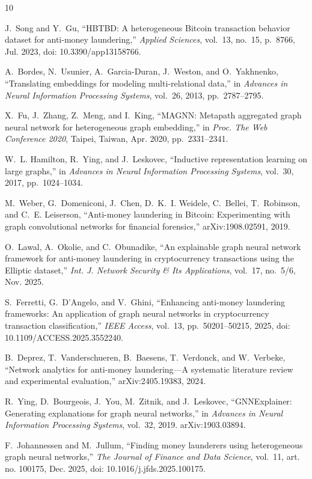 \documentclass[conference]{IEEEtran}
\begin{document}
\begin{thebibliography}{10}

J.~Song and Y.~Gu, ``HBTBD: A heterogeneous Bitcoin transaction behavior
dataset for anti-money laundering,'' \emph{Applied Sciences}, vol.~13,
no.~15, p.~8766, Jul. 2023, doi: 10.3390/app13158766.

A.~Bordes, N.~Usunier, A.~Garcia-Duran, J.~Weston, and O.~Yakhnenko,
``Translating embeddings for modeling multi-relational data,'' in
\emph{Advances in Neural Information Processing Systems}, vol.~26, 2013,
pp.~2787--2795.

X.~Fu, J.~Zhang, Z.~Meng, and I.~King, ``MAGNN: Metapath aggregated graph
neural network for heterogeneous graph embedding,'' in \emph{Proc. The Web
Conference 2020}, Taipei, Taiwan, Apr. 2020, pp.~2331--2341.

W.~L. Hamilton, R.~Ying, and J.~Leskovec, ``Inductive representation learning
on large graphs,'' in \emph{Advances in Neural Information Processing
Systems}, vol.~30, 2017, pp.~1024--1034.

M.~Weber, G.~Domeniconi, J.~Chen, D.~K.~I. Weidele, C.~Bellei, T.~Robinson,
and C.~E. Leiserson, ``Anti-money laundering in Bitcoin: Experimenting with
graph convolutional networks for financial forensics,'' arXiv:1908.02591,
2019.

O.~Lawal, A.~Okolie, and C.~Obunadike, ``An explainable graph neural network
framework for anti-money laundering in cryptocurrency transactions using the
Elliptic dataset,'' \emph{Int. J. Network Security \& Its Applications},
vol.~17, no.~5/6, Nov. 2025.

S.~Ferretti, G.~D'Angelo, and V.~Ghini, ``Enhancing anti-money laundering
frameworks: An application of graph neural networks in cryptocurrency
transaction classification,'' \emph{IEEE Access}, vol.~13, pp.~50201--50215,
2025, doi: 10.1109/ACCESS.2025.3552240.

B.~Deprez, T.~Vanderschueren, B.~Baesens, T.~Verdonck, and W.~Verbeke,
``Network analytics for anti-money laundering---A systematic literature
review and experimental evaluation,'' arXiv:2405.19383, 2024.

R.~Ying, D.~Bourgeois, J.~You, M.~Zitnik, and J.~Leskovec, ``GNNExplainer:
Generating explanations for graph neural networks,'' in \emph{Advances in
Neural Information Processing Systems}, vol.~32, 2019. arXiv:1903.03894.

F.~Johannessen and M.~Jullum, ``Finding money launderers using heterogeneous
graph neural networks,'' \emph{The Journal of Finance and Data Science},
vol.~11, art. no. 100175, Dec. 2025, doi: 10.1016/j.jfds.2025.100175.

\end{thebibliography}
\end{document}
